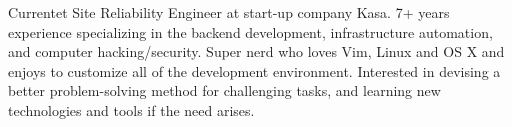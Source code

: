 

\begin{cvparagraph}

Currentet Site Reliability Engineer at start-up company Kasa. 7+ years experience specializing in the backend development, infrastructure automation, and computer hacking/security. Super nerd who loves Vim, Linux and OS X and enjoys to customize all of the development environment. Interested in devising a better problem-solving method for challenging tasks, and learning new technologies and tools if the need arises.
\end{cvparagraph}
